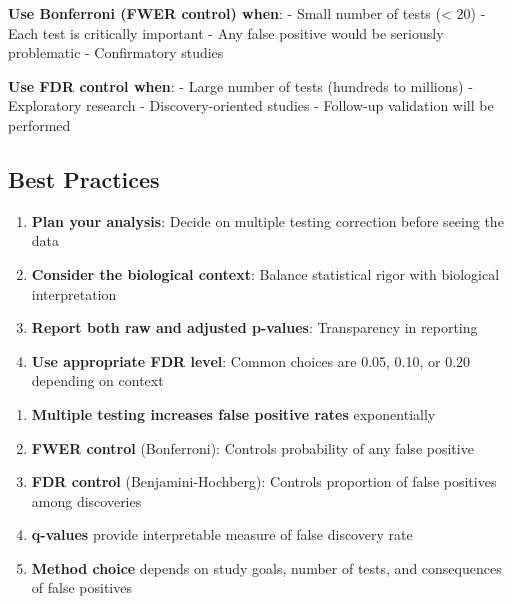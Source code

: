 \documentclass[
  11pt,
  letterpaper,
  oneside]{book}
\providecommand{\tightlist}{%
  \setlength{\itemsep}{0pt}\setlength{\parskip}{0pt}}\usepackage{longtable,booktabs,array}
\begin{document}
\textbf{Use Bonferroni (FWER control) when}: - Small number of tests
(\textless{} 20) - Each test is critically important - Any false
positive would be seriously problematic - Confirmatory studies

\textbf{Use FDR control when}: - Large number of tests (hundreds to
millions) - Exploratory research - Discovery-oriented studies -
Follow-up validation will be performed

\subsection{Best Practices}\label{best-practices}

\begin{enumerate}
\def\labelenumi{\arabic{enumi}.}
\tightlist
\item
  \textbf{Plan your analysis}: Decide on multiple testing correction
  before seeing the data
\item
  \textbf{Consider the biological context}: Balance statistical rigor
  with biological interpretation
\item
  \textbf{Report both raw and adjusted p-values}: Transparency in
  reporting
\item
  \textbf{Use appropriate FDR level}: Common choices are 0.05, 0.10, or
  0.20 depending on context
\end{enumerate}

\begin{tcolorbox}[enhanced jigsaw, toprule=.15mm, left=2mm, opacitybacktitle=0.6, colframe=quarto-callout-note-color-frame, leftrule=.75mm, titlerule=0mm, coltitle=black, colbacktitle=quarto-callout-note-color!10!white, toptitle=1mm, title=\textcolor{quarto-callout-note-color}{\faInfo}\hspace{0.5em}{Key Concepts Summary}, bottomtitle=1mm, arc=.35mm, rightrule=.15mm, bottomrule=.15mm, breakable, opacityback=0, colback=white]

\begin{enumerate}
\def\labelenumi{\arabic{enumi}.}
\tightlist
\item
  \textbf{Multiple testing increases false positive rates} exponentially
\item
  \textbf{FWER control} (Bonferroni): Controls probability of any false
  positive
\item
  \textbf{FDR control} (Benjamini-Hochberg): Controls proportion of
  false positives among discoveries
\item
  \textbf{q-values} provide interpretable measure of false discovery
  rate
\item
  \textbf{Method choice} depends on study goals, number of tests, and
  consequences of false positives
\end{enumerate}

\end{tcolorbox}
\end{document}
